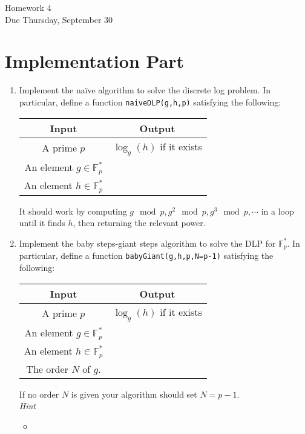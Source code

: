 \documentclass[11pt]{article}
\newcommand{\bF}{\mathbb{F}}
\begin{document}
\begin{center}
\Large {Homework 4}\\
\small {Due Thursday, September 30}
\end{center}
\section*{Implementation Part}
\begin{enumerate}
  \item{
  Implement the na\"ive algorithm to solve the discrete log problem.  In particular, define a function \verb|naiveDLP(g,h,p)| satisfying the following:
  \begin{center}
    \begin{tabular}{c|c}
      Input & Output\\
      \hline
      A prime $p$ & $\log_g(h)$ if it exists\\
      An element $g\in\bF_p^*$ & \\
      An element $h\in\bF_p^*$ & \\
    \end{tabular}
  \end{center}
 It should work by computing $g\mod p,g^2\mod p,g^3\mod p,\cdots$ in a loop until it finds $h$, then returning the relevant power.
  }
  \item{
  Implement the baby steps-giant steps algorithm to solve the DLP for $\bF_p^*$.  In particular, define a function \verb|babyGiant(g,h,p,N=p-1)| satisfying the following:
  \begin{center}
    \begin{tabular}{c|c}
      Input & Output\\
      \hline
      A prime $p$ & $\log_g(h)$ if it exists\\
      An element $g\in\bF_p^*$ & \\
      An element $h\in\bF_p^*$ & \\
      The order $N$ of $g$.
    \end{tabular}
  \end{center}
  If no order $N$ is given your algorithm should set $N=p-1$.\\
  \textit{Hint}
  \begin{itemize}
    \item{
}
\end{itemize}}
\end{enumerate}
\end{document}
